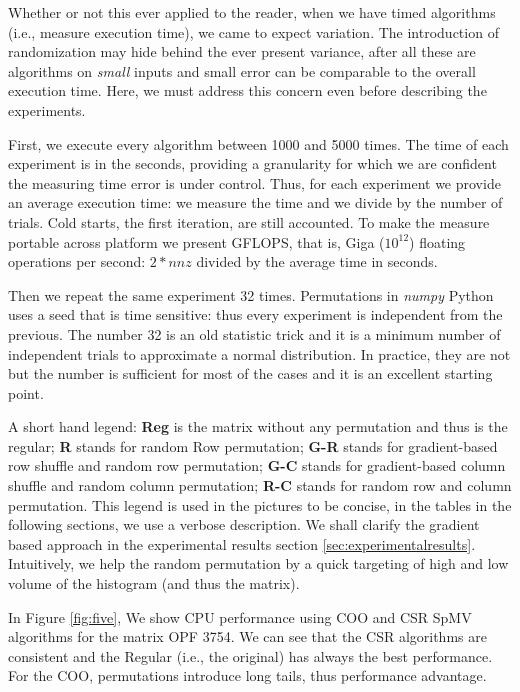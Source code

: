 \documentclass[manuscript,screen]{acmart}
\begin{document}
Whether or not this ever applied to the reader, when we have timed
algorithms (i.e., measure execution time), we came to expect
variation.  The introduction of randomization may hide behind the ever
present variance, after all these are algorithms on {\em small} inputs
and small error can be comparable to the overall execution time. Here,
we must address this concern even before describing the experiments.

First, we execute every algorithm between 1000 and 5000 times. The
time of each experiment is in the seconds, providing a granularity for
which we are confident the measuring time error is under
control. Thus, for each experiment we provide an average execution
time: we measure the time and we divide by the number of trials. Cold
starts, the first iteration, are still accounted. To make the measure
portable across platform we present GFLOPS, that is, Giga ($10^{12}$)
floating operations per second: $2*nnz$ divided by the average time in
seconds.

Then we repeat the same experiment 32 times. Permutations in {\em
  numpy} Python uses a seed that is time sensitive: thus every
experiment is independent from the previous. The number 32 is an old
statistic trick and it is a minimum number of independent trials to
approximate a normal distribution. In practice, they are not but the
number is sufficient for most of the cases and it is an excellent
starting point.

A short hand legend: {\bf Reg} is the matrix without any permutation
and thus is the regular; {\bf R} stands for random Row permutation;
{\bf G-R} stands for gradient-based row shuffle and random row
permutation; {\bf G-C} stands for gradient-based column shuffle and
random column permutation; {\bf R-C} stands for random row and column
permutation.  This legend is used in the pictures to be concise, in
the tables in the following sections, we use a verbose description. We
shall clarify the gradient based approach in the experimental results
section \ref{sec:experimentalresults}. Intuitively, we help the random
permutation by a quick targeting of high and low volume of the
histogram (and thus the matrix).


In Figure \ref{fig:five}, We show CPU performance using COO and CSR
SpMV algorithms for the matrix OPF 3754. We can see that the CSR
algorithms are consistent and the Regular (i.e., the original) has
always the best performance. For the COO, permutations introduce long
tails, thus performance advantage. 
\end{document}
